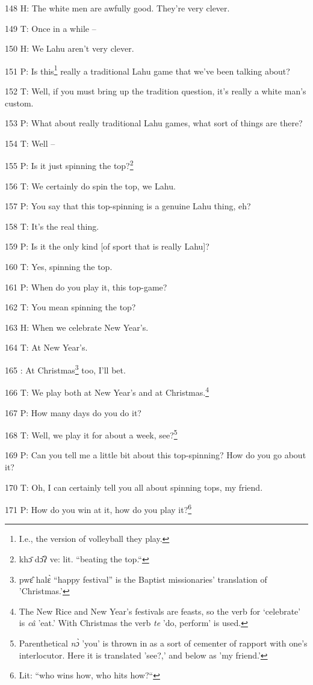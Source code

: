 148 H: The white men are awfully good. They're very clever.

149 T: Once in a while --

150 H: We Lahu aren't very clever.

151 P: Is this\footnote{I.e., the version of volleyball they play.} really a traditional Lahu game that we've been talking about?

152 T: Well, if you must bring up the tradition question, it's really a white man's
custom.

153 P: What about really traditional Lahu games, what sort of things are there?

154 T: Well --

155 P: Is it just spinning the top?\footnote{khɔ̄ dɔ̂ʔ ve: lit. ``beating the top.``}

156 T: We certainly do spin the top, we Lahu.

157 P: You say that this top-spinning is a genuine Lahu thing, eh?

158 T: It's the real thing.

159 P: Is it the only kind [of sport that is really Lahu]?

160 T: Yes, spinning the top.

161 P: When do you play it, this top-game?

162 T: You mean spinning the top?

163 H: When we celebrate New Year's.

164 T: At New Year's.

165 : At Christmas\footnote{pwɛ̂ halɛ̀ ``happy festival'' is the Baptist missionaries' translation of 'Christmas.'} too, I'll bet.

166 T: We play both at New Year's and at Christmas.\footnote{The New Rice and New Year's festivals are feasts, so the verb for `celebrate' is \textit{câ} 'eat.' With Christmas the verb \textit{te} 'do, perform' is used.}

167 P: How many days do you do it?

168 T: Well, we play it for about a week, see?\footnote{Parenthetical \textit{nɔ̀} 'you' is thrown in as a sort of cementer of rapport with one's interlocutor. Here it is translated 'see?,' and below as 'my friend.'}

169 P: Can you tell me a little bit about this top-spinning? How do you go about
it?

170 T: Oh, I can certainly tell you all about spinning tops, my friend.

171 P: How do you win at it, how do you play it?\footnote{Lit: ``who wins how, who hits how?``}

